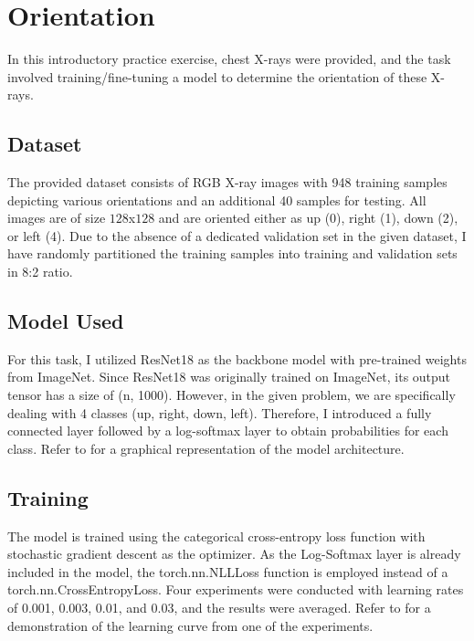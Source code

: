 \section{Orientation}
\label{sec:warmup2}

    In this introductory practice exercise, chest X-rays were provided, and the task involved training/fine-tuning a model to determine the orientation of these X-rays.

\subsection{Dataset}
    The provided dataset consists of RGB X-ray images with 948 training samples depicting various orientations and an additional 40 samples for testing. All images are of size $128$x$128$ and are oriented either as up (0), right (1), down (2), or left (4). Due to the absence of a dedicated validation set in the given dataset, I have randomly partitioned the training samples into training and validation sets in 8:2 ratio. 
\subsection{Model Used}

    For this task, I utilized ResNet18 as the backbone model with pre-trained weights from ImageNet. Since ResNet18 was originally trained on ImageNet, its output tensor has a size of (n, 1000). However, in the given problem, we are specifically dealing with 4 classes (up, right, down, left). Therefore, I introduced a fully connected layer followed by a log-softmax layer to obtain probabilities for each class. Refer to  for a graphical representation of the model architecture.
    

\subsection{Training}
    
    The model is trained using the categorical cross-entropy loss function with stochastic gradient descent as the optimizer. As the Log-Softmax layer is already included in the model, the torch.nn.NLLLoss function is employed instead of a torch.nn.CrossEntropyLoss. Four experiments were conducted with learning rates of 0.001, 0.003, 0.01, and 0.03, and the results were averaged. Refer to  for a demonstration of the learning curve from one of the experiments.

